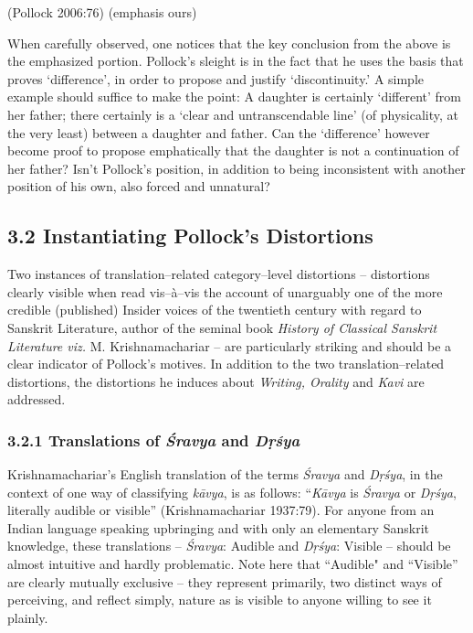 \hfill (Pollock 2006:76) (emphasis ours)

When carefully observed, one notices that the key conclusion from the above is the emphasized portion. Pollock’s sleight is in the fact that he uses the basis that proves ‘difference’, in order to propose and justify ‘discontinuity.’ A simple example should suffice to make the point: A daughter is certainly ‘different’ from her father; there certainly is a ‘clear and untranscendable line’ (of physicality, at the very least) between a daughter and father. Can the ‘difference’ however become proof to propose emphatically that the daughter is not a continuation of her father? Isn’t Pollock’s position, in addition to being inconsistent with another position of his own, also forced and unnatural?


\subsection*{3.2 Instantiating Pollock’s Distortions}

\vskip -8pt

Two instances of translation–related category–level distortions – distortions clearly visible when read vis–à–vis the account of unarguably one of the more credible (published) Insider voices of the twentieth century with regard to Sanskrit Literature, author of the seminal book \textit{History of Classical Sanskrit Literature viz.} M. Krishnamachariar – are particularly striking and should be a clear indicator of Pollock’s motives. In addition to the two translation–related distortions, the distortions he induces about \textit{Writing, Orality} and \textit{Kavi} are addressed. 

\vskip -18pt

\subsubsection*{3.2.1 Translations of \textit{Śravya} and \textit{Dṛśya}}

\vskip -5pt

Krishnamachariar’s English translation of the terms \textit{Śravya} and \textit{Dṛśya}, in the context of one way of classifying \textit{kāvya}, is as follows: “\textit{Kāvya} is \textit{Śravya} or \textit{Dṛśya}, literally audible or visible” (Krishnamachariar 1937:79). For anyone from an Indian language speaking upbringing and with only an elementary Sanskrit knowledge, these translations – \textit{Śravya}: Audible and \textit{Dṛśya}: Visible – should be almost intuitive and hardly problematic. Note here that “Audible" and “Visible” are clearly mutually exclusive – they represent primarily, two distinct ways of perceiving, and reflect simply, nature as is visible to anyone willing to see it plainly.


